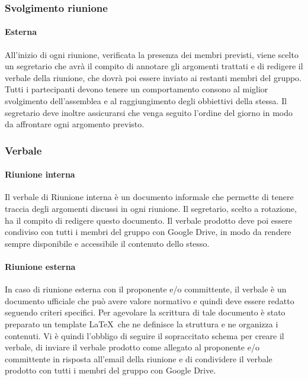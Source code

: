 \documentclass[../NormeDiProgetto.tex]{subfiles}
\begin{document}
				\subsubsection{Svolgimento riunione}
				\paragraph{Esterna\\}
				All'inizio di ogni riunione, verificata la presenza dei membri previsti, viene scelto un segretario che avrà il compito di annotare gli argomenti trattati e di redigere il verbale della riunione, che dovrà poi essere inviato ai restanti membri del gruppo. 
				Tutti i partecipanti devono tenere un comportamento consono al miglior svolgimento dell'assemblea e al raggiungimento degli obbiettivi della stessa. Il segretario deve inoltre assicurarsi che venga seguito l'ordine del giorno in modo da affrontare ogni argomento previsto.
				\subsubsection{Verbale}
				\paragraph{Riunione interna\\}
				Il verbale di Riunione interna è un documento informale che permette di tenere traccia degli argomenti discussi in ogni riunione. Il segretario, scelto a rotazione, ha il compito di redigere questo documento. Il verbale prodotto deve poi essere condiviso con tutti i membri del gruppo con Google Drive, in modo da rendere sempre disponibile e accessibile il contenuto dello stesso.
				\paragraph{Riunione esterna\\}
				In caso di riunione esterna con il proponente e/o committente, il verbale è un documento ufficiale che può avere valore normativo e quindi deve essere redatto seguendo criteri specifici.
				Per agevolare la scrittura di tale documento è stato preparato un template \LaTeX\ che ne definisce la struttura e ne organizza i contenuti. Vi è quindi l'obbligo di seguire il sopraccitato schema per creare il verbale, di inviare il verbale prodotto come allegato al proponente e/o committente in risposta all'email della riunione e di condividere il 
				verbale prodotto con tutti i membri del gruppo con Google Drive.
\end{document}
